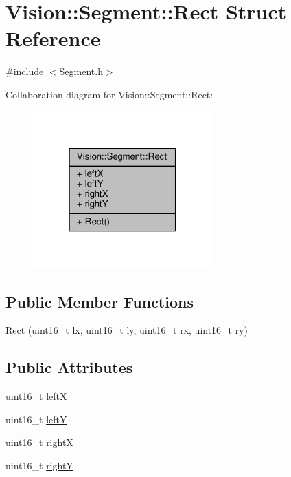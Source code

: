 \hypertarget{struct_vision_1_1_segment_1_1_rect}{}\section{Vision\+:\+:Segment\+:\+:Rect Struct Reference}
\label{struct_vision_1_1_segment_1_1_rect}


{\ttfamily \#include $<$Segment.\+h$>$}



Collaboration diagram for Vision\+:\+:Segment\+:\+:Rect\+:\nopagebreak
\begin{figure}[H]
\begin{center}
\leavevmode
\includegraphics[width=196pt]{struct_vision_1_1_segment_1_1_rect__coll__graph}
\end{center}
\end{figure}
\subsection*{Public Member Functions}
\begin{DoxyCompactItemize}
\item 
\hyperlink{struct_vision_1_1_segment_1_1_rect_acfc8bc65045c6d7d6949f11db26c248a}{Rect} (uint16\+\_\+t lx, uint16\+\_\+t ly, uint16\+\_\+t rx, uint16\+\_\+t ry)
\end{DoxyCompactItemize}
\subsection*{Public Attributes}
\begin{DoxyCompactItemize}
\item 
uint16\+\_\+t \hyperlink{struct_vision_1_1_segment_1_1_rect_acf3a2a045d75348971e57df5eeb7808e}{left\+X}
\item 
uint16\+\_\+t \hyperlink{struct_vision_1_1_segment_1_1_rect_ac6d22f96862077f159abc7e1accc20ab}{left\+Y}
\item 
uint16\+\_\+t \hyperlink{struct_vision_1_1_segment_1_1_rect_a6de0dfefe6b8360ee4d57027d1fba928}{right\+X}
\item 
uint16\+\_\+t \hyperlink{struct_vision_1_1_segment_1_1_rect_ab1a913248c715c25362c478498246983}{right\+Y}
\end{DoxyCompactItemize}


